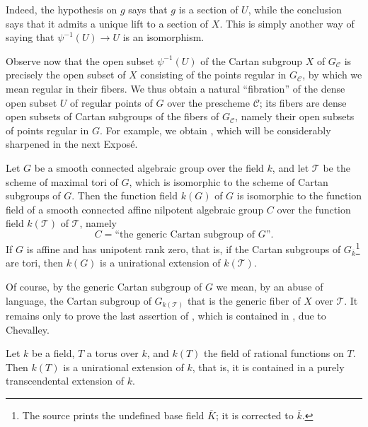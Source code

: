 Indeed, the hypothesis on \(g\) says that \(g\) is a section of
\(U\), while the conclusion says that it admits a unique lift to a
section of \(X\). This is simply another way of saying that
\(\psi^{-1}(U)\to U\) is an isomorphism.

Observe now that the open subset \(\psi^{-1}(U)\) of the Cartan
subgroup \(X\) of \(G_{\mathcal C}\) is precisely the open subset of
\(X\) consisting of the points regular in \(G_{\mathcal C}\), by
which we mean regular in their fibers. We thus obtain a natural
``fibration'' of the dense open subset \(U\) of regular points of
\(G\) over the prescheme \(\mathcal C\); its fibers are dense open
subsets of Cartan subgroups of the fibers of \(G_{\mathcal C}\),
namely their open subsets of points regular in \(G\). For example, we
obtain , which will be considerably sharpened in
the next Exposé.

\begin{corollary}
Let \(G\) be a smooth connected algebraic group over the field \(k\),
and let \(\mathcal T\) be the scheme of maximal tori of \(G\), which
is isomorphic to the scheme of Cartan subgroups of \(G\). Then the
function field \(k(G)\) of \(G\) is isomorphic to the function field
of a smooth connected affine nilpotent algebraic group \(C\) over the
function field \(k(\mathcal T)\) of \(\mathcal T\), namely
\[
  C=\text{``the generic Cartan subgroup of \(G\)''}.
\]
If \(G\) is affine and has unipotent rank zero, that is, if the Cartan
subgroups of \(G_{\overline k}\)\footnote{The source prints the
undefined base field \(\overline K\); it is corrected to
\(\overline k\).} are tori, then \(k(G)\) is a
unirational extension of \(k(\mathcal T)\).
\end{corollary}

Of course, by the generic Cartan subgroup of \(G\) we mean, by an
abuse of language, the Cartan subgroup of \(G_{k(\mathcal T)}\) that
is the generic fiber of \(X\) over \(\mathcal T\). It remains only to
prove the last assertion of , which is contained in , due to Chevalley.

\begin{lemma}
Let \(k\) be a field, \(T\) a torus over \(k\), and \(k(T)\) the
field of rational functions on \(T\). Then \(k(T)\) is a
unirational extension of \(k\), that is, it is contained in a purely
transcendental extension of \(k\).
\end{lemma}

